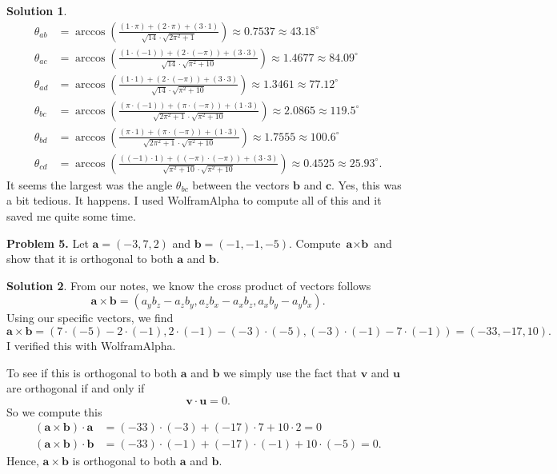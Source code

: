 \documentclass[12pt]{report} %
\theoremstyle{definition}
\newtheorem{solution}{Solution}
\begin{document}
\begin{solution}
\begin{align*}
    \theta_{ab}&=\arccos\left( \frac{(1\cdot \pi)+(2\cdot \pi)+(3\cdot 1)}{\sqrt{14}\cdot\sqrt{2\pi^2+1}}\right)\approx0.7537\approx 43.18^\circ\\
    \theta_{ac}&=\arccos\left( \frac{(1\cdot (-1))+(2\cdot (-\pi))+(3\cdot 3)}{\sqrt{14}\cdot\sqrt{\pi^2+10}}\right)\approx1.4677\approx 84.09^\circ\\
    \theta_{ad}&=\arccos\left( \frac{(1\cdot 1)+(2\cdot (-\pi))+(3\cdot 3)}{\sqrt{14}\cdot\sqrt{\pi^2+10}}\right)\approx1.3461\approx 77.12^\circ\\
    \theta_{bc}&=\arccos\left( \frac{(\pi\cdot (-1))+(\pi \cdot (-\pi))+(1\cdot 3)}{\sqrt{2\pi^2+1}\cdot\sqrt{\pi^2+10}}\right)\approx2.0865\approx 119.5^\circ\\
    \theta_{bd}&=\arccos\left( \frac{(\pi\cdot 1)+(\pi \cdot (-\pi))+(1\cdot 3)}{\sqrt{2\pi^2+1}\cdot\sqrt{\pi^2+10}}\right)\approx1.7555\approx 100.6^\circ\\
    \theta_{cd}&=\arccos\left( \frac{((-1)\cdot 1)+((-\pi) \cdot (-\pi))+(3\cdot 3)}{\sqrt{\pi^2+10}\cdot\sqrt{\pi^2+10}}\right)\approx0.4525\approx 25.93^\circ.
\end{align*}
It seems the largest was the angle $\theta_{bc}$ between the vectors $\mathbf{b}$ and $\mathbf{c}$.  Yes, this was a bit tedious.  It happens.  I used WolframAlpha to compute all of this and it saved me quite some time.  
\end{solution}
\hspace{.5cm}

\noindent\textbf{Problem 5.} Let $\textbf{a} = (-3,7,2)$ and $\textbf{b} = (-1,-1,-5)$. Compute $\textbf{a}\times\textbf{b}$ and show that it is orthogonal to both $\textbf{a}$ and $\textbf{b}$.
\begin{solution}
From our notes, we know the cross product of vectors follows
\[
\mathbf{a}\times \mathbf{b}=(a_yb_z-a_zb_y,a_zb_x-a_xb_z,a_xb_y-a_yb_x).
\]
Using our specific vectors, we find
\[
\mathbf{a}\times \mathbf{b}=(7\cdot(-5)-2\cdot(-1),2\cdot (-1)-(-3)\cdot(-5),(-3)\cdot(-1)-7\cdot(-1))=(-33,-17,10).
\]
I verified this with WolframAlpha.  

To see if this is orthogonal to both $\mathbf{a}$ and $\mathbf{b}$ we simply use the fact that $\mathbf{v}$ and $\mathbf{u}$ are orthogonal if and only if
\[
\mathbf{v}\cdot \mathbf{u}=0.
\]
So we compute this
\begin{align*}
    (\mathbf{a}\times \mathbf{b})\cdot \mathbf{a}&=(-33)\cdot (-3)+(-17)\cdot 7+10\cdot 2= 0\\
    (\mathbf{a}\times \mathbf{b})\cdot \mathbf{b}&=(-33)\cdot (-1)+(-17)\cdot (-1)+10\cdot (-5)= 0.
\end{align*}
Hence, $\mathbf{a}\times \mathbf{b}$ is orthogonal to both $\mathbf{a}$ and $\mathbf{b}$.
\end{solution}
\hspace{.5cm}
\end{document}

